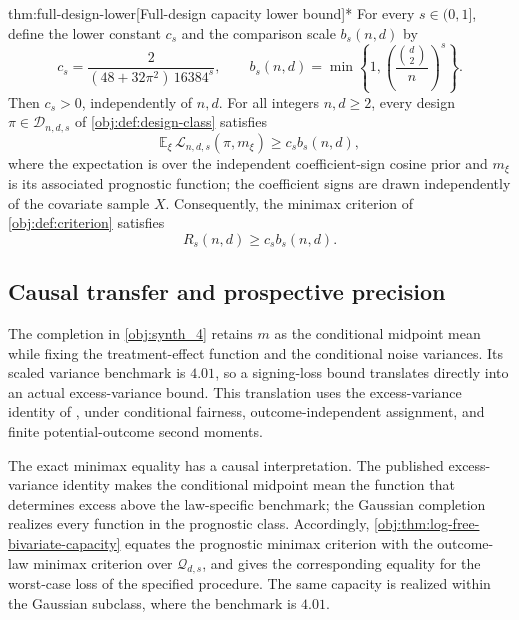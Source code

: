 \documentclass[11pt]{article}
\begin{document}
\begin{theoremv}{thm:full-design-lower}[Full-design capacity lower bound]*
For every \(s\in(0,1]\), define the lower constant \(c_s\) and the comparison scale \(b_s(n,d)\) by
\[
c_s=\frac{2}{(48+32\pi^2)\,16384^s},
\qquad
b_s(n,d)=\min\left\{1,\left(\frac{\binom d2}{n}\right)^s\right\}.
\]
Then \(c_s>0\), independently of \(n,d\). For all integers \(n,d\geq2\), every design \(\pi\in\mathcal D_{n,d,s}\) of \cref{obj:def:design-class} satisfies
\[
\mathbb E_\xi\,\mathcal L_{n,d,s}(\pi,m_\xi)
\geq c_s b_s(n,d),
\]
where the expectation is over the independent coefficient-sign cosine prior and \(m_\xi\) is its associated prognostic function; the coefficient signs are drawn independently of the covariate sample \(X\). Consequently, the minimax criterion of \cref{obj:def:criterion} satisfies
\[
R_s(n,d)\geq c_s b_s(n,d).
\]
\end{theoremv}

\subsection{Causal transfer and prospective precision}

The completion in \cref{obj:synth_4} retains \(m\) as the conditional midpoint mean while fixing the treatment-effect function and the conditional noise variances. Its scaled variance benchmark is \(4.01\), so a signing-loss bound translates directly into an actual excess-variance bound. This translation uses the excess-variance identity of \citet[Proposition~2.3 (Excess Variance), equation~(2.4), with Assumption~2.1 and Definition~2.2]{Cytrynbaum2026Limits}, under conditional fairness, outcome-independent assignment, and finite potential-outcome second moments.

The exact minimax equality has a causal interpretation. The published excess-variance identity makes the conditional midpoint mean the function that determines excess above the law-specific benchmark; the Gaussian completion realizes every function in the prognostic class. Accordingly, \cref{obj:thm:log-free-bivariate-capacity} equates the prognostic minimax criterion with the outcome-law minimax criterion over \(\mathcal Q_{d,s}\), and gives the corresponding equality for the worst-case loss of the specified procedure. The same capacity is realized within the Gaussian subclass, where the benchmark is \(4.01\).
\end{document}
